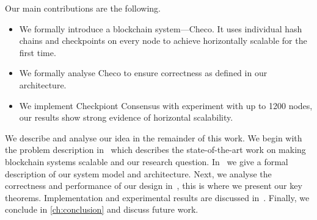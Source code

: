 Our main contributions are the following.
\begin{itemize}
    \item We formally introduce a blockchain system---Checo.
        It uses individual hash chains and checkpoints on every node to achieve
        horizontally scalable for the first time.
    \item We formally analyse Checo to ensure correctness as defined in our architecture.
    \item We implement Checkpiont Consensus with experiment with up to 1200 nodes,
        our results show strong evidence of horizontal scalability.
\end{itemize}

We describe and analyse our idea in the remainder of this work.
We begin with the problem description in~ which describes the state-of-the-art work on making blockchain systems scalable and our research question.
In~ we give a formal description of our system model and architecture.
Next, we analyse the correctness and performance of our design in~, this is where we present our key theorems.
Implementation and experimental results are discussed in~.
Finally, we conclude in \ref{ch:conclusion} and discuss future work.
